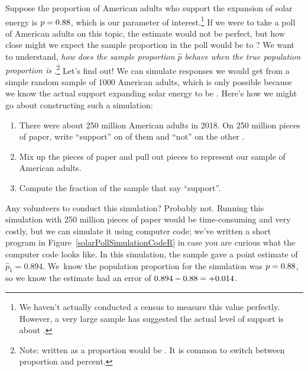Suppose the proportion of American adults who support
the expansion of solar energy is $p = 0.88{}$,
which is our parameter of interest.\footnote{We haven't
  actually conducted a census to measure this value perfectly.
  However, a very large sample has suggested the actual
  level of support is about \pewsolarparpercent{}.}
If we were to take a poll of \pewsolarpollsize{} American adults
on this topic, the estimate would not be perfect,
but how close might we expect the sample proportion
in the poll would be to \pewsolarparpercent{}?
We want to understand, \emph{how does the
sample proportion $\hat{p}$ behave when the true population
proportion is \pewsolarparprop{}}.\footnote{Note:
  \pewsolarparpercent{} written as a proportion would be
  \pewsolarparprop{}.
  It is common to switch between proportion and percent.}
Let's find out!
We can simulate responses we would get from a simple
random sample of 1000 American adults,
which is only possible because we know the actual
support expanding solar energy to be \pewsolarparprop{}.
%
%
%
Here's how we might go about constructing such a simulation:
\begin{enumerate}
\item There were about 250 million American adults in 2018.
    On 250 million pieces of paper, write ``support''
    on \pewsolarparpercent{} of them and ``not'' on
    the other \pewsolarparpercentcomplement{}.
\item Mix up the pieces of paper and pull out \pewsolarpollsize{}
    pieces to represent our sample of \pewsolarpollsize{}
    American adults.
\item Compute the fraction of the sample that say ``support''.
\end{enumerate}
Any volunteers to conduct this simulation? Probably not. Running
this simulation with 250 million pieces of paper would be
time-consuming and very costly, but we can simulate it
using computer code; we've written a short program in
Figure~\ref{solarPollSimulationCodeR}
in case you are curious what the computer code looks like.
In this simulation, the sample gave a point estimate of
$\hat{p}_1 = 0.894$. We~know the population proportion
for the simulation was $p = 0.88{}$, so we know
the estimate had an error of
$0.894 - 0.88{} = \text{+0.014}$.

